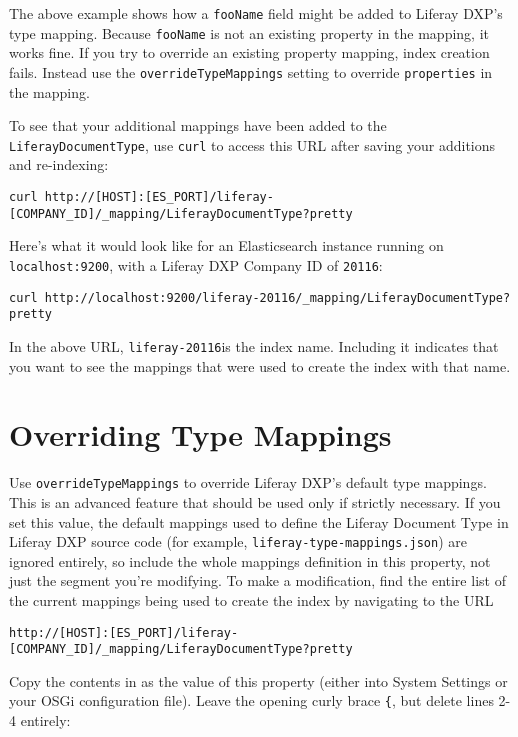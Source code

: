 The above example shows how a \texttt{fooName} field might be added to
Liferay DXP's type mapping. Because \texttt{fooName} is not an existing
property in the mapping, it works fine. If you try to override an
existing property mapping, index creation fails. Instead use the
\texttt{overrideTypeMappings} setting to override \texttt{properties} in
the mapping.

To see that your additional mappings have been added to the
\texttt{LiferayDocumentType}, use \texttt{curl} to access this URL after
saving your additions and re-indexing:

\begin{verbatim}
curl http://[HOST]:[ES_PORT]/liferay-[COMPANY_ID]/_mapping/LiferayDocumentType?pretty
\end{verbatim}

Here's what it would look like for an Elasticsearch instance running on
\texttt{localhost:9200}, with a Liferay DXP Company ID of
\texttt{20116}:

\begin{verbatim}
curl http://localhost:9200/liferay-20116/_mapping/LiferayDocumentType?pretty
\end{verbatim}

In the above URL, \texttt{liferay-20116}is the index name. Including it
indicates that you want to see the mappings that were used to create the
index with that name.

\section{Overriding Type Mappings}\label{overriding-type-mappings}

Use \texttt{overrideTypeMappings} to override Liferay DXP's default type
mappings. This is an advanced feature that should be used only if
strictly necessary. If you set this value, the default mappings used to
define the Liferay Document Type in Liferay DXP source code (for
example, \texttt{liferay-type-mappings.json}) are ignored entirely, so
include the whole mappings definition in this property, not just the
segment you're modifying. To make a modification, find the entire list
of the current mappings being used to create the index by navigating to
the URL

\begin{verbatim}
http://[HOST]:[ES_PORT]/liferay-[COMPANY_ID]/_mapping/LiferayDocumentType?pretty
\end{verbatim}

Copy the contents in as the value of this property (either into System
Settings or your OSGi configuration file). Leave the opening curly brace
\texttt{\{}, but delete lines 2-4 entirely:


